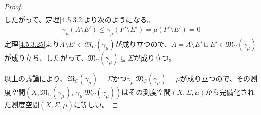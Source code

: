 \documentclass[dvipdfmx]{jsarticle}
\begin{document}
\begin{proof}
\begin{align*}
\end{align*}
したがって、定理\ref{4.5.3.2}より次のようになる。
\begin{align*}
\gamma_{\mu}\left( A \setminus E' \right) \leq \gamma_{\mu}\left( F' \setminus E' \right) = \mu\left( F' \setminus E' \right) = 0
\end{align*}
定理\ref{4.5.3.25}より$A \setminus E' \in \mathfrak{M}_{C}\left( \gamma_{\mu} \right)$が成り立つので、$A = A \setminus E' \sqcup E' \in \mathfrak{M}_{C}\left( \gamma_{\mu} \right)$が成り立ち、したがって、$\mathfrak{M}_{C}\left( \gamma_{\mu} \right) \subseteq \overline{\varSigma}$が成り立つ。\par
以上の議論により、$\mathfrak{M}_{C}\left( \gamma_{\mu} \right) = \overline{\varSigma}$かつ$\gamma_{\mu}|\mathfrak{M}_{C}\left( \gamma_{\mu} \right) = \overline{\mu}$が成り立つので、その測度空間$\left( X,\mathfrak{M}_{C}\left( \gamma_{\mu} \right),\ \gamma_{\mu}|\mathfrak{M}_{C}\left( \gamma_{\mu} \right) \right)$はその測度空間$(X,\varSigma,\mu)$から完備化された測度空間$\left( X,\overline{\varSigma},\overline{\mu} \right)$に等しい。
\end{proof}
\end{document}
